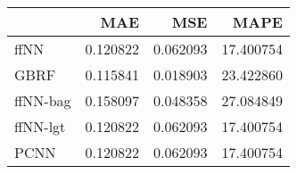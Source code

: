 \begin{tabular}{lrrr}
\toprule
{} &       MAE &       MSE &       MAPE \\
\midrule
ffNN     &  0.120822 &  0.062093 &  17.400754 \\
GBRF     &  0.115841 &  0.018903 &  23.422860 \\
ffNN-bag &  0.158097 &  0.048358 &  27.084849 \\
ffNN-lgt &  0.120822 &  0.062093 &  17.400754 \\
PCNN     &  0.120822 &  0.062093 &  17.400754 \\
\bottomrule
\end{tabular}
